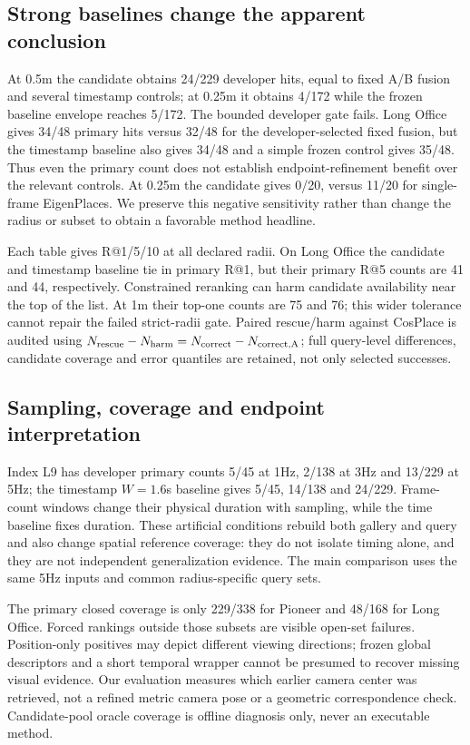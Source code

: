 \documentclass[conference,letterpaper]{IEEEtran}
\begin{document}
\subsection{Strong baselines change the apparent conclusion}
At 0.5m the candidate obtains 24/229 developer hits, equal to fixed A/B fusion and several timestamp controls; at 0.25m it obtains 4/172 while the frozen baseline envelope reaches 5/172. The bounded developer gate fails. Long Office gives 34/48 primary hits versus 32/48 for the developer-selected fixed fusion, but the timestamp baseline also gives 34/48 and a simple frozen control gives 35/48. Thus even the primary count does not establish endpoint-refinement benefit over the relevant controls. At 0.25m the candidate gives 0/20, versus 11/20 for single-frame EigenPlaces. We preserve this negative sensitivity rather than change the radius or subset to obtain a favorable method headline.

Each table gives R@1/5/10 at all declared radii. On Long Office the candidate and timestamp baseline tie in primary R@1, but their primary R@5 counts are 41 and 44, respectively. Constrained reranking can harm candidate availability near the top of the list. At 1m their top-one counts are 75 and 76; this wider tolerance cannot repair the failed strict-radii gate. Paired rescue/harm against CosPlace is audited using $N_{\rm rescue}-N_{\rm harm}=N_{\rm correct}-N_{\rm correct,A}$; full query-level differences, candidate coverage and error quantiles are retained, not only selected successes.

\subsection{Sampling, coverage and endpoint interpretation}
Index L9 has developer primary counts 5/45 at 1Hz, 2/138 at 3Hz and 13/229 at 5Hz; the timestamp $W=1.6$s baseline gives 5/45, 14/138 and 24/229. Frame-count windows change their physical duration with sampling, while the time baseline fixes duration. These artificial conditions rebuild both gallery and query and also change spatial reference coverage: they do not isolate timing alone, and they are not independent generalization evidence. The main comparison uses the same 5Hz inputs and common radius-specific query sets.

The primary closed coverage is only 229/338 for Pioneer and 48/168 for Long Office. Forced rankings outside those subsets are visible open-set failures. Position-only positives may depict different viewing directions; frozen global descriptors and a short temporal wrapper cannot be presumed to recover missing visual evidence. Our evaluation measures which earlier camera center was retrieved, not a refined metric camera pose or a geometric correspondence check. Candidate-pool oracle coverage is offline diagnosis only, never an executable method.
\end{document}
